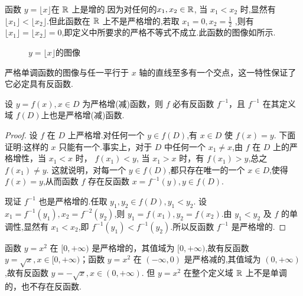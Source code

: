 \begin{example}
    函数 $y=\lfloor x \rfloor$在 $\mathbb{R}$ 上是增的.因为对任何的$x_1,x_2\in \mathbb{R}$, 当 $x_1<x_2$ 时,显然有 $\lfloor x_1 \rfloor < \lfloor x_2 \rfloor$.但此函数在 $\mathbb{R}$ 上不是严格增的,若取 $x_1=0,x_2=\frac{1}{2}$  ,则有 $\lfloor x_1 \rfloor = \lfloor x_2 \rfloor = 0$,即定义中所要求的严格不等式不成立.此函数的图像如所示.
\end{example}

\begin{figure}[htbp]
    \centering
    \caption{$y=\lfloor x \rfloor$的图像}
    \label{fig:floorfx}
\end{figure}

严格单调函数的图像与任一平行于 $x$ 轴的直线至多有一个交点，这一特性保证了它必定具有反函数.

\begin{theorem}\label{thm:zeng}
    设 $y=f(x),x\in D$ 为严格增(减)函数，则 $f$ 必有反函数 $f^{-1}$，且 $f^{-1}$ 在其定义域 $f(D)$上也是严格增(减)函数.
\end{theorem}

\begin{proof}
    设 $f$ 在 $D$ 上严格增.对任何一个 $y\in f(D)$,有 $x\in D$ 使 $f(x)=y$. 下面证明:这样的 $x$ 只能有一个.事实上，对于 $D$ 中任何一个 $x_1\ne x$,由 $f$ 在 $D$ 上的严格增性，当 $x_1<x$ 时， $f(x_1)<y$, 当 $x_1>x$ 时，有 $f(x_1)>y$,总之 $f(x_1)\ne y$. 这就说明，对每一个 $y\in f(D)$,都只存在唯一的一个 $x\in D$,使得 $f(x)=y$,从而函数 $f$ 存在反函数 $x=f^{-1}(y),y\in f(D)$.

    现证 $f^{-1}$ 也是严格增的.任取 $y_1,y_2\in f(D),y_1<y_2$. 设 $x_1=f^{-1}(y_1),x_2=f^{-2}(y_2)$,则 $y_1=f(x_1),y_2=f(x_2)$.由 $y_1<y_2$ 及 $f$ 的单调性,显然有 $x_1<x_2$,即 $f^{-1}(y_1)<f^{-1}(y_2)$.所以反函数 $f^{-1}$ 是严格增的.
\end{proof}

\begin{example}
    函数 $y=x^2$ 在 $[0,+\infty)$ 是严格增的，其值域为 $[0,+\infty)$,故有反函数 $y=\sqrt{x},x\in [0,+\infty)$；函数 $y=x^2$ 在 $(-\infty,0)$ 是严格减的,其值域为 $(0,+\infty)$,故有反函数 $y=-\sqrt{x},x\in (0,+\infty)$. 但 $y=x^2$ 在整个定义域 $\mathbb{R}$ 上不是单调的，也不存在反函数.
\end{example}

